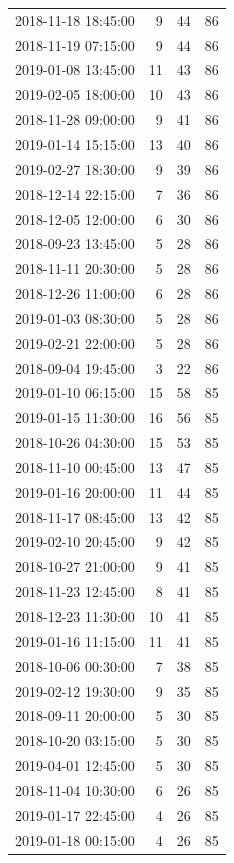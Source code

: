 \begin{tabular}{lrrr}
2018-11-18 18:45:00 & 9 & 44 & 86 \\
2018-11-19 07:15:00 & 9 & 44 & 86 \\
2019-01-08 13:45:00 & 11 & 43 & 86 \\
2019-02-05 18:00:00 & 10 & 43 & 86 \\
2018-11-28 09:00:00 & 9 & 41 & 86 \\
2019-01-14 15:15:00 & 13 & 40 & 86 \\
2019-02-27 18:30:00 & 9 & 39 & 86 \\
2018-12-14 22:15:00 & 7 & 36 & 86 \\
2018-12-05 12:00:00 & 6 & 30 & 86 \\
2018-09-23 13:45:00 & 5 & 28 & 86 \\
2018-11-11 20:30:00 & 5 & 28 & 86 \\
2018-12-26 11:00:00 & 6 & 28 & 86 \\
2019-01-03 08:30:00 & 5 & 28 & 86 \\
2019-02-21 22:00:00 & 5 & 28 & 86 \\
2018-09-04 19:45:00 & 3 & 22 & 86 \\
2019-01-10 06:15:00 & 15 & 58 & 85 \\
2019-01-15 11:30:00 & 16 & 56 & 85 \\
2018-10-26 04:30:00 & 15 & 53 & 85 \\
2018-11-10 00:45:00 & 13 & 47 & 85 \\
2019-01-16 20:00:00 & 11 & 44 & 85 \\
2018-11-17 08:45:00 & 13 & 42 & 85 \\
2019-02-10 20:45:00 & 9 & 42 & 85 \\
2018-10-27 21:00:00 & 9 & 41 & 85 \\
2018-11-23 12:45:00 & 8 & 41 & 85 \\
2018-12-23 11:30:00 & 10 & 41 & 85 \\
2019-01-16 11:15:00 & 11 & 41 & 85 \\
2018-10-06 00:30:00 & 7 & 38 & 85 \\
2019-02-12 19:30:00 & 9 & 35 & 85 \\
2018-09-11 20:00:00 & 5 & 30 & 85 \\
2018-10-20 03:15:00 & 5 & 30 & 85 \\
2019-04-01 12:45:00 & 5 & 30 & 85 \\
2018-11-04 10:30:00 & 6 & 26 & 85 \\
2019-01-17 22:45:00 & 4 & 26 & 85 \\
2019-01-18 00:15:00 & 4 & 26 & 85 \\

\end{tabular}
